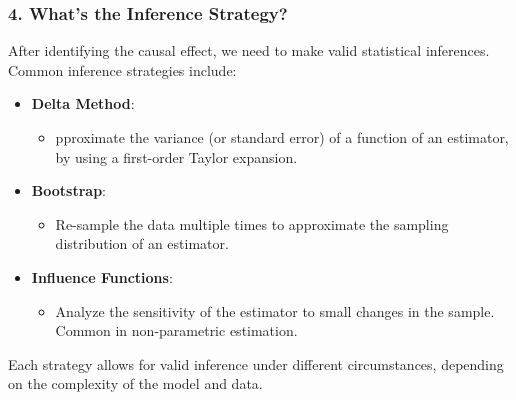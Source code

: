 \documentclass[xcolor=svgnames,t]{beamer}
\begin{document}
\begin{frame}
    \frametitle{4. What's the Inference Strategy?}

    After identifying the causal effect, we need to make valid statistical inferences. Common inference strategies include:
    \begin{itemize}
        \item \textbf{Delta Method}: 
        \begin{itemize}
            \item pproximate the variance (or standard error) of a function of an estimator, by using a first-order Taylor expansion.
        \end{itemize}

        \pause
        \item \textbf{Bootstrap}: 
        \begin{itemize}
            \item Re-sample the data multiple times to approximate the sampling distribution of an estimator. 
        \end{itemize}

        \pause
        \item \textbf{Influence Functions}: 
        \begin{itemize}
            \item Analyze the sensitivity of the estimator to small changes in the sample. Common in non-parametric estimation.
        \end{itemize}
    \end{itemize}

    Each strategy allows for valid inference under different circumstances, depending on the complexity of the model and data.
\end{frame}
\end{document}
